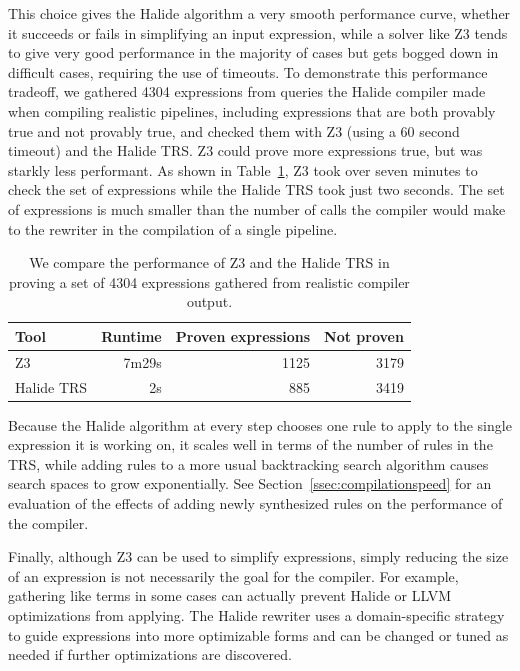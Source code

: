 \documentclass[sigplan,10pt,review,anonymous]{acmart}\settopmatter{printfolios=true,printccs=false,printacmref=false}
\begin{document}
This choice gives the Halide algorithm a very smooth performance curve, whether it succeeds or fails in simplifying an input expression, while a solver like Z3 tends to give very good performance in the majority of cases but gets bogged down in difficult cases, requiring the use of timeouts. To demonstrate this performance tradeoff, we gathered 4304 expressions from queries the Halide compiler made when compiling realistic pipelines, including expressions that are both provably true and not provably true, and checked them with Z3 (using a 60 second timeout) and the Halide TRS. Z3 could prove more expressions true, but was starkly less performant. As shown in Table~\ref{tab:simplifiervsz3}, Z3 took over seven minutes to check the set of expressions while the Halide TRS took just two seconds. The set of expressions is much smaller than the number of calls the compiler would make to the rewriter in the compilation of a single pipeline.

\begin{table}
\caption{We compare the performance of Z3 and the Halide TRS in proving a set of 4304 expressions gathered from realistic compiler output.}
\begin{tabular}{l|r|r|r}
Tool & Runtime & Proven expressions & Not proven \\
\hline
Z3 & 7m29s & 1125 & 3179 \\
Halide TRS & 2s & 885 & 3419 
\end{tabular}
\label{tab:simplifiervsz3}
\end{table}

Because the Halide algorithm at every step chooses one rule to apply to the single expression it is working on, it scales well in terms of the number of rules in the TRS, while adding rules to a more usual backtracking search algorithm causes search spaces to grow exponentially. See Section~\ref{ssec:compilationspeed} for an evaluation of the effects of adding newly synthesized rules on the performance of the compiler. 

Finally, although Z3 can be used to simplify expressions, simply reducing the size of an expression is not necessarily the goal for the compiler. For example, gathering like terms in some cases can actually prevent Halide or LLVM optimizations from applying. The Halide rewriter uses a domain-specific strategy to guide expressions into more optimizable forms and can be changed or tuned as needed if further optimizations are discovered. 

\end{document}
